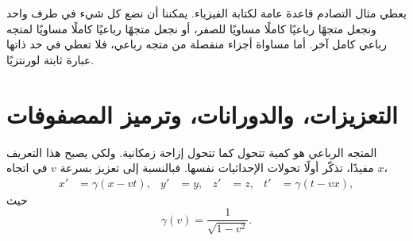 يعطي مثال التصادم قاعدة عامة لكتابة الفيزياء. يمكننا أن نضع كل شيء في طرف واحد ونجعل متجهًا رباعيًا كاملًا مساويًا للصفر، أو نجعل متجهًا رباعيًا كاملًا مساويًا لمتجه رباعي كامل آخر. أما مساواة أجزاء منفصلة من متجه رباعي، فلا تعطي في حد ذاتها عبارة ثابتة لورنتزيًا.

\section{التعزيزات، والدورانات، وترميز المصفوفات}

المتجه الرباعي هو كمية تتحول كما تتحول إزاحة زمكانية. ولكي يصبح هذا التعريف مفيدًا، تذكّر أولًا تحولات الإحداثيات نفسها. فبالنسبة إلى تعزيز بسرعة \(v\) في اتجاه \(x\)، \begin{align}
  x'&=\gamma(x-vt), & y'&=y, & z'&=z,
  & t'&=\gamma(t-vx),                                      \label{eq:l6-boost}
\end{align} حيث \begin{equation}
  \gamma(v)=\frac{1}{\sqrt{1-v^2}}.
\end{equation}

\begin{classroomqa}   \end{classroomqa}

